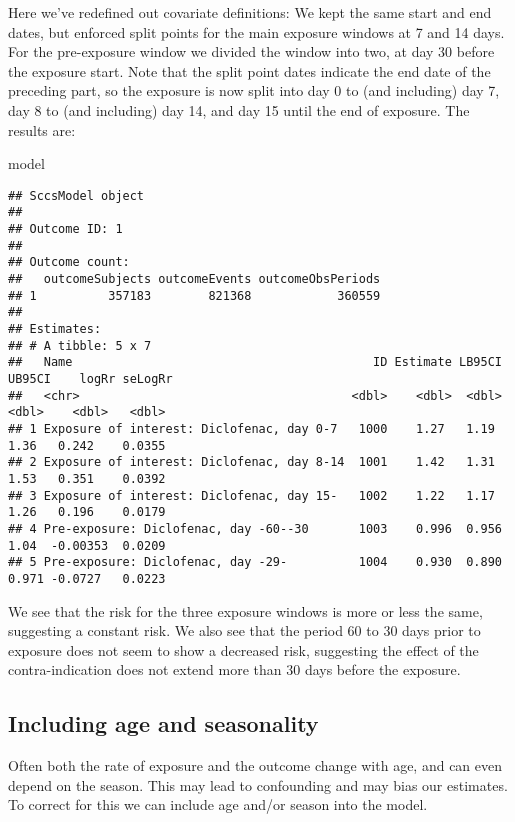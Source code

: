 \documentclass[
]{article}
\newenvironment{Shaded}{\begin{snugshade}}{\end{snugshade}}
\newcommand{\NormalTok}[1]{#1}
\begin{document}
Here we've redefined out covariate definitions: We kept the same start
and end dates, but enforced split points for the main exposure windows
at 7 and 14 days. For the pre-exposure window we divided the window into
two, at day 30 before the exposure start. Note that the split point
dates indicate the end date of the preceding part, so the exposure is
now split into day 0 to (and including) day 7, day 8 to (and including)
day 14, and day 15 until the end of exposure. The results are:

\begin{Shaded}
\begin{Highlighting}[]
\NormalTok{model}
\end{Highlighting}
\end{Shaded}

\begin{verbatim}
## SccsModel object
## 
## Outcome ID: 1
## 
## Outcome count:
##   outcomeSubjects outcomeEvents outcomeObsPeriods
## 1          357183        821368            360559
## 
## Estimates:
## # A tibble: 5 x 7
##   Name                                          ID Estimate LB95CI UB95CI    logRr seLogRr
##   <chr>                                      <dbl>    <dbl>  <dbl>  <dbl>    <dbl>   <dbl>
## 1 Exposure of interest: Diclofenac, day 0-7   1000    1.27   1.19   1.36   0.242    0.0355
## 2 Exposure of interest: Diclofenac, day 8-14  1001    1.42   1.31   1.53   0.351    0.0392
## 3 Exposure of interest: Diclofenac, day 15-   1002    1.22   1.17   1.26   0.196    0.0179
## 4 Pre-exposure: Diclofenac, day -60--30       1003    0.996  0.956  1.04  -0.00353  0.0209
## 5 Pre-exposure: Diclofenac, day -29-          1004    0.930  0.890  0.971 -0.0727   0.0223
\end{verbatim}

We see that the risk for the three exposure windows is more or less the
same, suggesting a constant risk. We also see that the period 60 to 30
days prior to exposure does not seem to show a decreased risk,
suggesting the effect of the contra-indication does not extend more than
30 days before the exposure.

\hypertarget{including-age-and-seasonality}{%
\subsection{Including age and
seasonality}\label{including-age-and-seasonality}}

Often both the rate of exposure and the outcome change with age, and can
even depend on the season. This may lead to confounding and may bias our
estimates. To correct for this we can include age and/or season into the
model.
\end{document}
